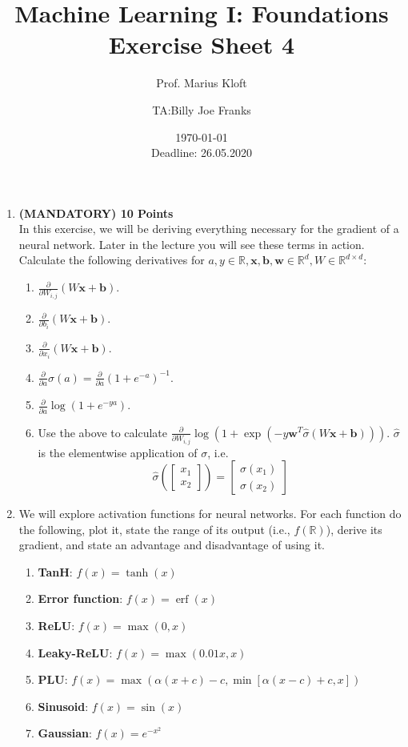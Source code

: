 \documentclass[]{scrartcl}
\author{Prof. Marius Kloft \and TA:Billy Joe Franks}
\title{Machine Learning I: Foundations \\ Exercise Sheet 4}
\date{\today\\Deadline: 26.05.2020}
\newcommand{\R}{\mathbb{R}}
\newcommand{\bx}{\mathbf{x}}
\newcommand{\bb}{\mathbf{b}}
\newcommand{\bw}{\mathbf{w}}
\DeclareMathOperator\erf{erf}
\begin{document}
\maketitle

\begin{enumerate}

\item \textbf{(MANDATORY) 10 Points}\\ In this exercise, we will be deriving everything necessary for the gradient of a neural network. Later in the lecture you will see these terms in action. Calculate the following derivatives for $a,y\in\R, \bx,\bb,\bw\in\R^d, W\in\R^{d\times d}$:
\begin{enumerate}
\item $\frac{\partial}{\partial W_{i,j}}(W\bx+\bb).$
\item $\frac{\partial}{\partial b_i}(W\bx+\bb).$
\item $\frac{\partial}{\partial x_i}(W\bx+\bb).$
\item $\frac{\partial}{\partial a} \sigma(a)=\frac{\partial}{\partial a}\left(1+e^{-a}\right)^{-1}.$
\item $\frac{\partial}{\partial a} \log{(1+e^{-ya})}.$
\item Use the above to calculate $\frac{\partial}{\partial W_{i,j}} \log{(1+\exp(-y\bw^T\hat{\sigma}(W\bx+\bb)))}.$ $\hat{\sigma}$ is the elementwise application of $\sigma$, i.e.
\[\hat{\sigma}\left(\begin{bmatrix}x_1\\x_2\end{bmatrix}\right)=\begin{bmatrix}\sigma(x_1)\\\sigma(x_2)\end{bmatrix}\]
\end{enumerate}

\item We will explore activation functions for neural networks. For each function do the following, plot it, state the range of its output (i.e., $f(\R)$), derive its gradient, and state an advantage and disadvantage of using it.
\begin{enumerate}
\item \textbf{TanH}: $f(x)=\tanh(x)$
\item \textbf{Error function}: $f(x)=\erf(x)$
\item \textbf{ReLU}: $f(x)=\max{(0,x)}$
\item \textbf{Leaky-ReLU}: $f(x)=\max{(0.01x,x)}$
\item \textbf{PLU}: $f(x)=\max{(\alpha(x+c)-c, \min{[\alpha(x-c)+c,x]})}$
\item \textbf{Sinusoid}: $f(x)=\sin(x)$
\item \textbf{Gaussian}: $f(x)=e^{-x^2}$
\end{enumerate}


\end{enumerate}
\end{document}

